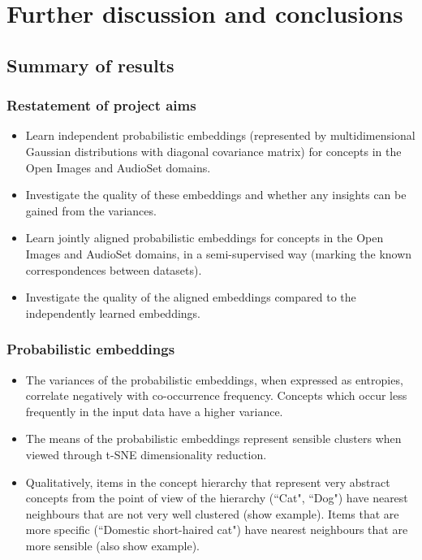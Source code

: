 \chapter{Further discussion and conclusions}


\section{Summary of results}

\subsection{Restatement of project aims}

\begin{itemize}
    \item Learn independent probabilistic embeddings (represented by multidimensional Gaussian distributions with diagonal covariance matrix) for concepts in the Open Images and AudioSet domains.
    \item Investigate the quality of these embeddings and whether any insights can be gained from the variances.
    \item Learn jointly aligned probabilistic embeddings for concepts in the Open Images and AudioSet domains, in a semi-supervised way (marking the known correspondences between datasets). 
    \item Investigate the quality of the aligned embeddings compared to the independently learned embeddings. 
\end{itemize}

\subsection{Probabilistic embeddings}

\begin{itemize}
    \item The variances of the probabilistic embeddings, when expressed as entropies,  correlate negatively with co-occurrence frequency. Concepts which occur less frequently in the input data have a higher variance. 
    \item The means of the probabilistic embeddings represent sensible clusters when viewed through t-SNE dimensionality reduction. 
    \item Qualitatively, items in the concept hierarchy that represent very abstract concepts from the point of view of the hierarchy (``Cat", ``Dog") have nearest neighbours that are not very well clustered (show example). Items that are more specific (``Domestic short-haired cat")  have nearest neighbours that are more sensible (also show example). 
\end{itemize}

